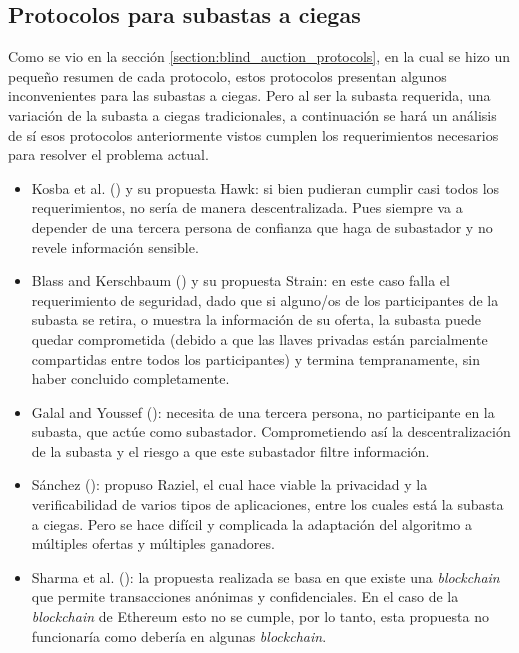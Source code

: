   \subsection{Protocolos para subastas a ciegas}
    Como se vio en la sección \ref{section:blind_auction_protocols}, en la cual se hizo un pequeño resumen
    de cada protocolo, estos protocolos presentan algunos inconvenientes para las subastas a ciegas.
    Pero al ser la subasta requerida, una variación de la subasta a ciegas tradicionales, a continuación
    se hará un análisis de sí esos protocolos anteriormente vistos cumplen los requerimientos necesarios
    para resolver el problema actual.

    \begin{itemize}
      \item Kosba et al. (\citeyear{kosba2016hawk}) y su propuesta Hawk: si bien pudieran cumplir casi
      todos los requerimientos, no sería de manera descentralizada. Pues siempre va a depender de una
      tercera persona de confianza que haga de subastador y no revele información sensible.

      \item Blass and Kerschbaum (\citeyear{blass2017strain}) y su propuesta Strain: en este caso falla
      el requerimiento de seguridad, dado que si alguno/os de los participantes de la subasta se retira,
      o muestra la información de su oferta, la subasta puede quedar comprometida (debido a que las 
      llaves privadas están parcialmente compartidas entre todos los participantes) y termina 
      tempranamente, sin haber concluido completamente.

      \item Galal and Youssef (\citeyear{galalyusef2018a}): necesita de una tercera persona, no participante
      en la subasta, que actúe como subastador. Comprometiendo así la descentralización de la subasta y el
      riesgo a que este subastador filtre información.
      
      \item Sánchez (\citeyear{sanchez2020}): propuso Raziel, el cual hace viable la privacidad y la
      verificabilidad de varios tipos de aplicaciones, entre los cuales está la subasta a ciegas. Pero
      se hace difícil y complicada la adaptación del algoritmo a múltiples ofertas y múltiples ganadores.

      \item Sharma et al. (\citeyear{sharma2021}): la propuesta realizada se basa en que existe 
      una \textit{blockchain} que permite transacciones anónimas y confidenciales. En el caso de la 
      \textit{blockchain} de Ethereum esto no se cumple, por lo tanto, esta propuesta no funcionaría como debería
      en algunas \textit{blockchain}.


\end{itemize}
